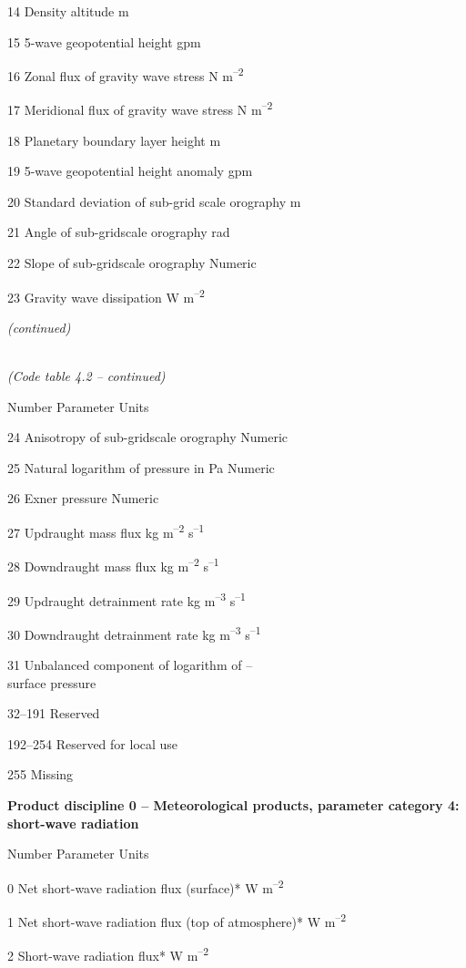 14 Density altitude m

15 5-wave geopotential height gpm

16 Zonal flux of gravity wave stress N m\textsuperscript{--2}

17 Meridional flux of gravity wave stress N m\textsuperscript{--2}

18 Planetary boundary layer height m

19 5-wave geopotential height anomaly gpm

20 Standard deviation of sub-grid scale orography m

21 Angle of sub-gridscale orography rad

22 Slope of sub-gridscale orography Numeric

23 Gravity wave dissipation W m\textsuperscript{--2}

\emph{(continued)}

\emph{\\
(Code table 4.2 -- continued)}

Number Parameter Units

24 Anisotropy of sub-gridscale orography Numeric

25 Natural logarithm of pressure in Pa Numeric

26 Exner pressure Numeric

27 Updraught mass flux kg m\textsuperscript{--2} s\textsuperscript{--1}

28 Downdraught mass flux kg m\textsuperscript{--2} s\textsuperscript{--1}

29 Updraught detrainment rate kg m\textsuperscript{--3} s\textsuperscript{--1}

30 Downdraught detrainment rate kg m\textsuperscript{--3} s\textsuperscript{--1}

31 Unbalanced component of logarithm of --\\
surface pressure

32--191 Reserved

192--254 Reserved for local use

255 Missing

\textbf{Product discipline 0 -- Meteorological products, parameter category 4: short-wave radiation}

Number Parameter Units

0 Net short-wave radiation flux (surface)* W m\textsuperscript{--2}

1 Net short-wave radiation flux (top of atmosphere)* W m\textsuperscript{--2}

2 Short-wave radiation flux* W m\textsuperscript{--2}

